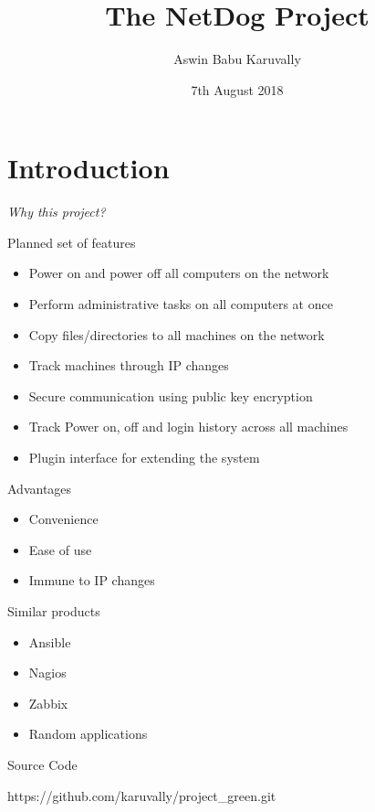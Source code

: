 \documentclass{beamer}
\title[Your Short Title]{The NetDog Project}
\author{Aswin Babu Karuvally}
\institute{College of Engineering Trivandrum}
\date{7th August 2018}
\begin{document}
\begin{frame}
    \titlepage
\end{frame}

\section{Introduction}

\begin{frame}
    \begin{center}
        \em Why this project?
    \end{center}
\end{frame}

\begin{frame}{Planned set of features}
    \begin{itemize}
        \item<2-> Power on and power off all computers on the network
        \item<3-> Perform administrative tasks on all computers at once
        \item<4-> Copy files/directories to all machines on the network
        \item<5-> Track machines through IP changes
        \item<6-> Secure communication using public key encryption
        \item<7-> Track Power on, off and login history across all machines
        \item<8-> Plugin interface for extending the system
    \end{itemize}
\end{frame}

\begin{frame}{Advantages}
    \begin{itemize}
        \item<2-> Convenience
        \item<3-> Ease of use
        \item<4-> Immune to IP changes 
    \end{itemize}
\end{frame}

\begin{frame}{Similar products}
    \begin{itemize}
        \item<2-> Ansible
        \item<3-> Nagios
        \item<4-> Zabbix
        \item<5-> Random applications
    \end{itemize}
\end{frame}

\begin{frame}{Source Code} 
    \begin{center}
        \large https://github.com/karuvally/project\_green.git
    \end{center}
\end{frame}
\end{document}
